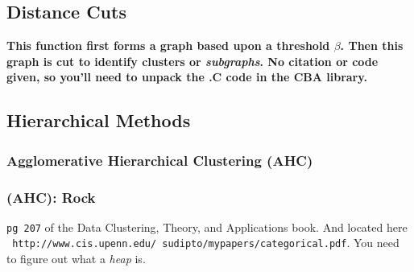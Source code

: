 \documentclass[11pt,letterpaper]{article}
\numberwithin{equation}{section}
\begin{document}
\begin{table}[hbt!]
\caption{Maximum Entropy Clustering Algorithm} 
\end{table}



\subsection{Distance Cuts}
\textbf{This function first forms a graph based upon a threshold
$\beta$.  Then this graph is cut to identify clusters or
\emph{subgraphs}.  No citation or code given, so you'll need to
unpack the .C code in the CBA library. }



\subsection{Hierarchical Methods}


\subsubsection{Agglomerative Hierarchical Clustering (AHC)}
\subsubsection{(AHC): Rock}
{\tt pg 207} of the Data Clustering, Theory, and Applications book.
And located here \\ {\tt
http://www.cis.upenn.edu/~sudipto/mypapers/categorical.pdf}.  You
need to figure out what a \emph{heap} is.
\end{document}
